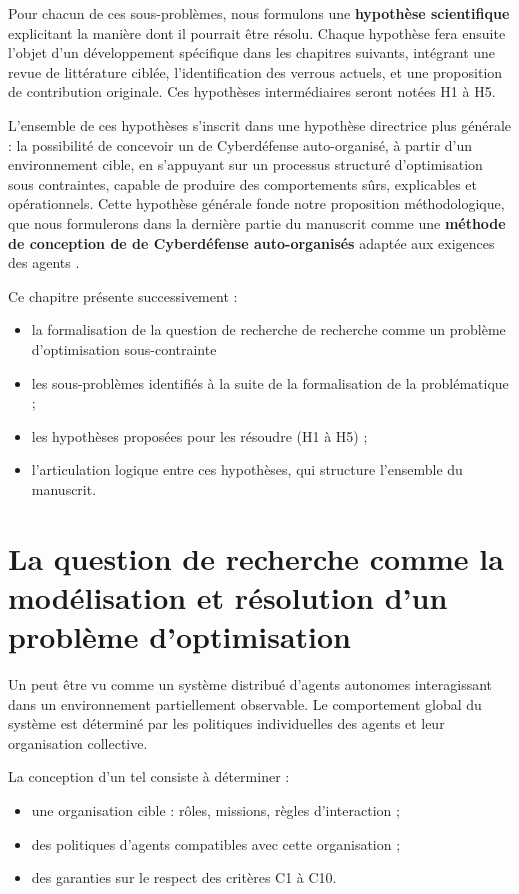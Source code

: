 Pour chacun de ces sous-problèmes, nous formulons une \textbf{hypothèse scientifique} explicitant la manière dont il pourrait être résolu. Chaque hypothèse fera ensuite l'objet d'un développement spécifique dans les chapitres suivants, intégrant une revue de littérature ciblée, l'identification des verrous actuels, et une proposition de contribution originale. Ces hypothèses intermédiaires seront notées H1 à H5.

L'ensemble de ces hypothèses s'inscrit dans une hypothèse directrice plus générale : la possibilité de concevoir un  de Cyberdéfense auto-organisé, à partir d'un environnement cible, en s'appuyant sur un processus structuré d'optimisation sous contraintes, capable de produire des comportements sûrs, explicables et opérationnels. Cette hypothèse générale fonde notre proposition méthodologique, que nous formulerons dans la dernière partie du manuscrit comme une \textbf{méthode de conception de  de Cyberdéfense auto-organisés} adaptée aux exigences des agents .

Ce chapitre présente successivement :
\begin{itemize}
    \item la formalisation de la question de recherche de recherche comme un problème d'optimisation sous-contrainte
    \item les sous-problèmes identifiés à la suite de la formalisation de la problématique ;
    \item les hypothèses proposées pour les résoudre (H1 à H5) ;
    \item l'articulation logique entre ces hypothèses, qui structure l'ensemble du manuscrit.
\end{itemize}

\section{La question de recherche comme la modélisation et résolution d'un problème d'optimisation}

Un  peut être vu comme un système distribué d'agents autonomes interagissant dans un environnement partiellement observable. Le comportement global du système est déterminé par les politiques individuelles des agents et leur organisation collective.

La conception d'un tel  consiste à déterminer :
\begin{itemize}
    \item une organisation cible : rôles, missions, règles d'interaction ;
    \item des politiques d'agents compatibles avec cette organisation ;
    \item des garanties sur le respect des critères C1 à C10.
\end{itemize}

